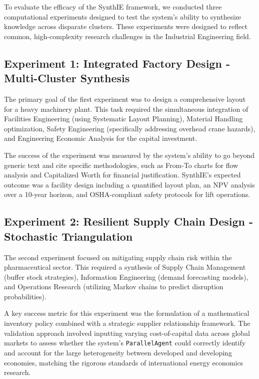 \documentclass[12pt,a4paper]{article}
\begin{document}
To evaluate the efficacy of the SynthIE framework, we conducted three computational experiments designed to test the system's ability to synthesize knowledge across disparate clusters. These experiments were designed to reflect common, high-complexity research challenges in the Industrial Engineering field.

\subsection{Experiment 1: Integrated Factory Design - Multi-Cluster Synthesis}

The primary goal of the first experiment was to design a comprehensive layout for a heavy machinery plant. This task required the simultaneous integration of Facilities Engineering (using Systematic Layout Planning), Material Handling optimization, Safety Engineering (specifically addressing overhead crane hazards), and Engineering Economic Analysis for the capital investment. 

The success of the experiment was measured by the system's ability to go beyond generic text and cite specific methodologies, such as From-To charts for flow analysis and Capitalized Worth for financial justification. SynthIE's expected outcome was a facility design including a quantified layout plan, an NPV analysis over a 10-year horizon, and OSHA-compliant safety protocols for lift operations.

\subsection{Experiment 2: Resilient Supply Chain Design - Stochastic Triangulation}

The second experiment focused on mitigating supply chain risk within the pharmaceutical sector. This required a synthesis of Supply Chain Management (buffer stock strategies), Information Engineering (demand forecasting models), and Operations Research (utilizing Markov chains to predict disruption probabilities). 

A key success metric for this experiment was the formulation of a mathematical inventory policy combined with a strategic supplier relationship framework. The validation approach involved inputting varying cost-of-capital data across global markets to assess whether the system's \texttt{ParallelAgent} could correctly identify and account for the large heterogeneity between developed and developing economies, matching the rigorous standards of international energy economics research.
\end{document}
